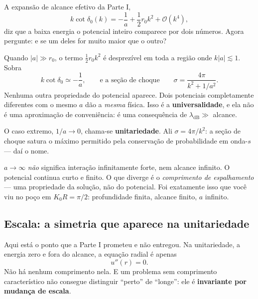 \documentclass[11pt,a4paper]{article}
\begin{document}
A expansão de alcance efetivo da Parte I,
\begin{equation}
k\cot\delta_{0}(k) = -\frac{1}{a} + \frac{1}{2}r_{0}k^{2} + \mathcal{O}(k^{4}),
\label{eq:ere}
\end{equation}
diz que a baixa energia o potencial inteiro comparece por dois números. Agora
pergunte: e se um deles for muito maior que o outro?

Quando $|a| \gg r_{0}$, o termo $\tfrac12 r_{0}k^{2}$ é desprezível em toda a região
onde $k|a|\lesssim 1$. Sobra
\begin{equation}
k\cot\delta_{0}\simeq -\frac{1}{a},
\qquad\text{e a seção de choque}\qquad
\sigma = \frac{4\pi}{k^{2}+1/a^{2}}.
\end{equation}
Nenhuma outra propriedade do potencial aparece. Dois potenciais completamente
diferentes com o mesmo $a$ dão a \emph{mesma} física. Isso é a
\textbf{universalidade}, e ela não é uma aproximação de conveniência: é uma
consequência de $\lambda_{\text{dB}} \gg$ alcance.

O caso extremo, $1/a \to 0$, chama-se \textbf{unitariedade}. Ali
$\sigma = 4\pi/k^{2}$: a seção de choque satura o máximo permitido pela
conservação de probabilidade em onda-$s$ — daí o nome.

\begin{atencao}
$a \to \infty$ \emph{não} significa interação infinitamente forte, nem alcance
infinito. O potencial continua curto e finito. O que diverge é o
\emph{comprimento de espalhamento} --- uma propriedade da solução, não do potencial.
Foi exatamente isso que você viu no poço em $K_{0}R = \pi/2$: profundidade finita,
alcance finito, $a$ infinito.
\end{atencao}

\subsection{Escala: a simetria que aparece na unitariedade}

Aqui está o ponto que a Parte I prometeu e não entregou. Na unitariedade, a energia
zero e fora do alcance, a equação radial é apenas
\begin{equation}
u''(r) = 0.
\end{equation}
Não há nenhum comprimento nela. E um problema sem comprimento característico não
consegue distinguir ``perto'' de ``longe'': ele é \textbf{invariante por mudança de
escala}.
\end{document}
